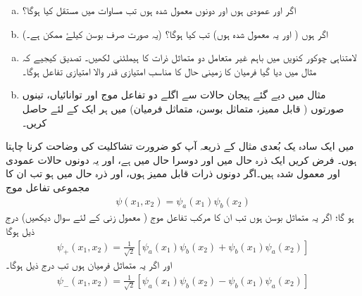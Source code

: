 \begin{enumerate}[a.]
\item
اگر  اور   عمودی ہوں اور دونوں معمول شدہ ہوں تب مساوات    میں مستقل  کیا ہوگا؟ 
\item
اگر   ہوں ( اور یہ معمول شدہ ہوں)  تب    کیا ہوگا؟ (یہ صورت صرف بوسن کیلۓ ممکن ہے۔)
\end{enumerate}
\begin{enumerate}[a.]
\item
لامتناہی چوکور کنویں  میں باہم غیر متعامل دو متماثل ذرات کا ہیملٹنی لکھیں۔ تصدیق کیجیے کہ مثال    میں دیا گیا فرمیان کا زمینی حال   کا مناسب امتیازی قدر والا امتیازی تفاعل ہوگا۔ 
\item
مثال    میں دیے گئے ہیجان حالات سے اگلے دو  تفاعل موج اور توانائیاں،  تینوں صورتوں ( قابل ممیز، متماثل بوسن، متماثل فرمیان)   میں ہر ایک کے لئے  حاصل کریں۔
\end{enumerate}


میں ایک سادہ یک بُعدی مثال کے ذریعہ آپ کو ضرورت تشاکلیت کی وضاحت کرنا چاہتا ہوں۔ فرض کریں ایک  ذرہ حال  میں اور دوسرا حال  میں ہے،   اور یہ دونوں حالات عمودی اور معمول شدہ  ہیں۔اگر  دونوں  ذرات قابل ممیز ہوں،  اور ذرہ  حال  میں ہو تب ان کا مجموعی تفاعل موج
\begin{align}\label{مساوات_متماثل_مجموعی_تفاعل_موج_قابل_ممیز}
	\psi(x_1, x_2)=\psi_a(x_1)\psi_b(x_2)
\end{align}
ہو گا؛ اگر یہ متماثل بوسن ہوں تب ان کا مرکب تفاعل موج ( معمول زنی کے لئے   سوال   دیکھیں)  درج ذیل ہوگا
\begin{align}\label{مساوات_متماثل_مجموعی_تفاعل_موج_متماثل_بوسن}
	\psi_+(x_1, x_2) = \frac{1}{\sqrt{2}}[\psi_a(x_1)\psi_b(x_2)+\psi_b(x_1)\psi_a(x_2)]
\end{align}
اور اگر یہ متماثل فرمیان ہوں تب درج ذیل ہوگا۔
\begin{align}\label{مساوات_متماثل_مجموعی_تفاعل_موج_متماثل_فرمیان}
	\psi_-(x_1, x_2)=\frac{1}{\sqrt{2}}[\psi_a(x_1)\psi_b(x_2)-\psi_b(x_1)\psi_a(x_2)]
\end{align}

